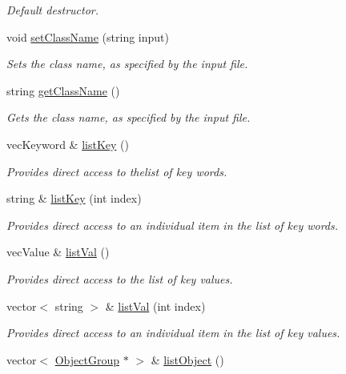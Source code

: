 \begin{DoxyCompactItemize}
\begin{DoxyCompactList}\small\item\em Default destructor. \end{DoxyCompactList}\item 
void \hyperlink{class_object_group_ad545fcd3a91db25743d45d92e8955164}{set\-Class\-Name} (string input)
\begin{DoxyCompactList}\small\item\em Sets the class name, as specified by the input file. \end{DoxyCompactList}\item 
string \hyperlink{class_object_group_aa158e9516621ab6e2b690bad6c6619b5}{get\-Class\-Name} ()
\begin{DoxyCompactList}\small\item\em Gets the class name, as specified by the input file. \end{DoxyCompactList}\item 
vec\-Keyword \& \hyperlink{class_object_group_a0f44d28c868ba60971af1a7aceb2e5bd}{list\-Key} ()
\begin{DoxyCompactList}\small\item\em Provides direct access to thelist of key words. \end{DoxyCompactList}\item 
string \& \hyperlink{class_object_group_a4b52a556b4404a1d13d50d0a3808eec2}{list\-Key} (int index)
\begin{DoxyCompactList}\small\item\em Provides direct access to an individual item in the list of key words. \end{DoxyCompactList}\item 
vec\-Value \& \hyperlink{class_object_group_a6c3064de310a852551d438a5f31f987f}{list\-Val} ()
\begin{DoxyCompactList}\small\item\em Provides direct access to the list of key values. \end{DoxyCompactList}\item 
vector$<$ string $>$ \& \hyperlink{class_object_group_af23637baa7d1b46b34dcb5e5de4b68bd}{list\-Val} (int index)
\begin{DoxyCompactList}\small\item\em Provides direct access to an individual item in the list of key values. \end{DoxyCompactList}\item 
vector$<$ \hyperlink{class_object_group}{Object\-Group} $\ast$ $>$ \& \hyperlink{class_object_group_a13cd6186adf626bf61b279f1f6f75790}{list\-Object} ()

\end{DoxyCompactItemize}
